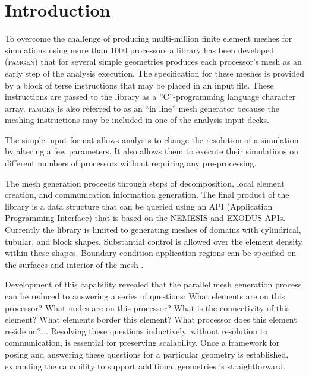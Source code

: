 \section{Introduction}
To overcome the challenge of producing multi{}-million finite element
meshes for simulations using more than 1000 processors a library has been 
developed (\textsc{pamgen}) that for several simple geometries produces each processor's mesh as an early step of the analysis execution. The specification for these meshes is provided by a block of terse instructions that may be placed in an input file. These instructions are passed to the library as a {}''C{}''-programming language character array. \textsc{pamgen} is also referred to as an ``in line'' mesh generator because the meshing instructions may be included in one of the analysis input decks.

The simple input format allows analysts to change the resolution of 
a simulation by altering a few parameters. It also allows them to execute their simulations on
different numbers of processors without requiring any pre-processing.

The mesh generation proceeds through steps of decomposition, local
element creation, and communication information generation. The final
product of the library is a data structure that can be queried using an API (Application Programming Interface) that is based on the NEMESIS and EXODUS APIs. Currently the library
is limited to generating meshes of domains with cylindrical, tubular,
and block shapes. Substantial control is allowed over the element
density within these shapes. Boundary condition application  
regions can be specified on the surfaces and interior of the mesh .

Development of this capability revealed that the parallel mesh
generation process can be reduced to answering a series of questions:
What elements are on this processor? What nodes are on this processor?
What is the connectivity of this element? What elements border this
element? What processor does this element reside on?... Resolving these
questions inductively, without resolution to communication, is
essential for preserving scalability. Once a framework
for posing and answering these questions for a particular geometry is
established, expanding the capability to support additional geometries
is straightforward.

